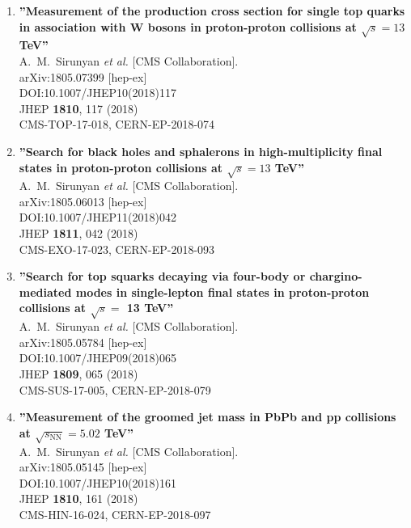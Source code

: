 \begin{enumerate}
\item%
{\bf ''Measurement of the production cross section for single top quarks in association with W bosons in proton-proton collisions at $ \sqrt{s}=13 $ TeV''}
  \\{}A.~M.~Sirunyan {\it et al.} [CMS Collaboration].
  \\{}arXiv:1805.07399 [hep-ex]
  \\{}DOI:10.1007/JHEP10(2018)117
  \\{}JHEP {\bf 1810}, 117 (2018)
  \\{}CMS-TOP-17-018, CERN-EP-2018-074

\item%
{\bf ''Search for black holes and sphalerons in high-multiplicity final states in proton-proton collisions at $ \sqrt{s}=13 $ TeV''}
  \\{}A.~M.~Sirunyan {\it et al.} [CMS Collaboration].
  \\{}arXiv:1805.06013 [hep-ex]
  \\{}DOI:10.1007/JHEP11(2018)042
  \\{}JHEP {\bf 1811}, 042 (2018)
  \\{}CMS-EXO-17-023, CERN-EP-2018-093

\item%
{\bf ''Search for top squarks decaying via four-body or chargino-mediated modes in single-lepton final states in proton-proton collisions at $\sqrt{s} =$ 13 TeV''}
  \\{}A.~M.~Sirunyan {\it et al.} [CMS Collaboration].
  \\{}arXiv:1805.05784 [hep-ex]
  \\{}DOI:10.1007/JHEP09(2018)065
  \\{}JHEP {\bf 1809}, 065 (2018)
  \\{}CMS-SUS-17-005, CERN-EP-2018-079

\item%
{\bf ''Measurement of the groomed jet mass in PbPb and pp collisions at $ \sqrt{s_{\mathrm{NN}}}=5.02 $ TeV''}
  \\{}A.~M.~Sirunyan {\it et al.} [CMS Collaboration].
  \\{}arXiv:1805.05145 [hep-ex]
  \\{}DOI:10.1007/JHEP10(2018)161
  \\{}JHEP {\bf 1810}, 161 (2018)
  \\{}CMS-HIN-16-024, CERN-EP-2018-097


\end{enumerate}
